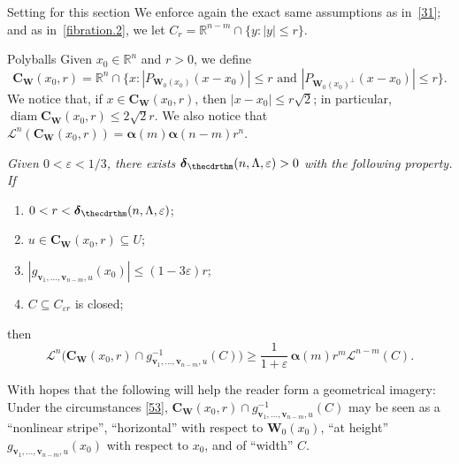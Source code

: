\documentclass[JEP,XML,SOM,Unicode,ThmDefs,NoEqCountersInSection]{cedram}
\newenvironment{Empty}[2][\null]{%
\begin{enonce}[remark]{#1}#2}
{\end{enonce}}
\newcommand{\R}{\mathbb{R}}
\newcommand{\Rn}{\R^n}
\newcommand{\calL}{\mathscr{L}}
\newcommand{\balpha}{\boldsymbol{\alpha}}
\newcommand{\bdelta}{\boldsymbol{\delta}}
\newcommand{\bC}{{\boldsymbol{C}}}
\newcommand{\bW}{{\boldsymbol{W}}}
\newcommand{\bv}{{\boldsymbol{v}}}
\DeclareMathOperator{\rmdiam}{\mathrm{diam}}
\let\veps\varepsilon
\let\subset\subseteq
\begin{document}
\begin{Empty}[Setting for this section]
\label{51}
We enforce again the exact same assumptions as in~\ref{31}; and as in~\ref{fibration.2}, we let $C_r = \R^{n-m} \cap \{ y: |y| \leq r \}$.
\end{Empty}

\begin{Empty}[Polyballs]
\label{pb}
Given $x_0 \in \Rn$ and $r > 0$, we define
\begin{equation*}
\bC_\bW(x_0,r) = \Rn \cap \bigl\{ x: \left| P_{\bW_0(x_0)}(x-x_0)\right| \leq r \text{ and } \left| P_{\bW_0(x_0)^\perp}(x-x_0)\right| \leq r \bigr\}.
\end{equation*}
We notice that, if $x \in \bC_\bW(x_0,r)$, then $|x-x_0| \leq r \sqrt{2}$; in particular, $\rmdiam \bC_\bW(x_0,r) \!\leq\! 2 \sqrt{2}r$.
We also notice that $\calL^n(\bC_\bW(x_0,r)) = \balpha(m)\balpha(n-m)r^n$.
\end{Empty}

\begin{Empty}[]
\label{53}
{\it
Given $0 < \veps < 1/3$, there exists $\bdelta_{\thecdrthm}(n,\Lambda,\veps) > 0$ with the following property. If
\begin{enumerate}
\item\label{enum:43.1} $0 < r < \bdelta_{\thecdrthm}(n,\Lambda,\veps)$;
\item\label{enum:43.2} $u \in \bC_\bW(x_0,r) \subset U$;
\item\label{enum:43.3} $|g_{\bv_1,\ldots,\bv_{n-m},u}(x_0)| \leq (1-3\veps)r$;
\item\label{enum:43.4} $C \subset C_{\veps r}$ is closed;
\end{enumerate}
then
\begin{equation*}
\calL^n \bigl(\bC_\bW(x_0,r) \cap g_{\bv_1,\ldots,\bv_{n-m},u}^{-1}(C)\bigr) \geq \frac{1}{1+\veps}\, \balpha(m) r^m \calL^{n-m}(C).
\end{equation*}
}
\end{Empty}

\begin{Remark}
With hopes that the following will help the reader form a geometrical imagery: Under the circumstances \ref{53}, $\bC_\bW(x_0,r) \cap g_{\bv_1,\ldots,\bv_{n-m},u}^{-1}(C)$ may be seen as a ``nonlinear stripe'', ``horizontal'' with respect to $\bW_0(x_0)$, ``at height'' $g_{\bv_1,\ldots,\bv_{n-m},u}(x_0)$ with respect to $x_0$, and of ``width'' $C$.
\end{Remark}
\end{document}
